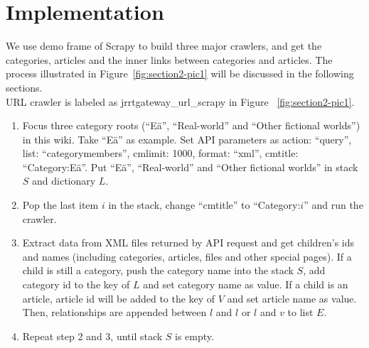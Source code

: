 \section{Implementation}
\vspace{-5pt}
We use demo frame of Scrapy to build three major crawlers, and get the categories, articles and the inner links between categories and articles. The process illustrated in Figure~\ref{fig:section2-pic1} will be discussed in the following sections.\\
\noindent URL crawler is labeled as jrrtgateway\_url\_scrapy in  Figure~ \ref{fig:section2-pic1}.
\vspace{-5pt}
\begin{enumerate}
	\item Focus three category roots (``Eä'', ``Real-world'' and ``Other fictional worlds'') in this wiki. Take ``Eä'' as example. Set API parameters as {action: ``query'', list: ``categorymembers'', cmlimit: 1000, format: ``xml'', cmtitle: ``Category:Eä''}. Put ``Eä'', ``Real-world'' and ``Other fictional worlds'' in stack $S$ and dictionary $L$.
	\item Pop the last item $i$ in the stack, change ``cmtitle'' to ``Category:$i$'' and run the crawler. 
	\item Extract data from XML files returned by API request and get children's ids and names (including categories, articles, files and other special pages). If a child is still a category, push the category name into the stack $S$, add category id to the key of $L$ and set category name as value. If a child is an article, article id will be added to the key of $V$ and set article name as value. Then, relationships are appended between $l$ and $l$ or $l$ and $v$ to list $E$.
	\item Repeat step 2 and 3, until stack $S$ is empty.
\end{enumerate}
